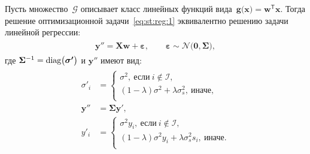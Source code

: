 \begin{theorem}
\label{theorem:st:reg}
Пусть множество~$\mathcal{G}$ описывает класс линейных функций вида~$\mathbf{g}\bigr(\mathbf{x}\bigr) = \mathbf{w}^{\mathsf{T}}\mathbf{x}.$ Тогда решение оптимизационной задачи~\eqref{eq:st:reg:1} эквивалентно решению задачи линейной регрессии:
\begin{gather}
\label{eq:st:reg:th:st:1}
\begin{aligned}
\mathbf{y''} = \mathbf{X}\mathbf{w} + \bm{\varepsilon},\qquad \bm{\varepsilon} \sim \mathcal{N}\bigr(\mathbf{0}, \bm{\Sigma}\bigr),
\end{aligned}
\end{gather}
где $\bm{\Sigma}^{-1}={\text{\normalfont{diag}}}\bigr(\bm{\sigma'}\bigr)$ и $\mathbf{y''}$ имеют вид:
\begin{gather}
\label{eq:st:reg:th:st:2}
\begin{aligned}
\sigma'_{i} &= \begin{cases}
\sigma^2,~\text{если}~i \not \in \mathcal{I},\\
\left(1-\lambda\right)\sigma^2+\lambda\sigma_s^2,~\text{иначе},\\
\end{cases}\\
\mathbf{y''} &= \bm{\Sigma}\mathbf{y'},\\
y'_i &= \begin{cases}
\sigma^2y_i,~\text{если}~i \not \in \mathcal{I},\\
\left(1-\lambda\right)\sigma^2y_i+\lambda\sigma_s^2s_i,~\text{иначе}.\\
\end{cases}
\end{aligned}
\end{gather}
\end{theorem}
